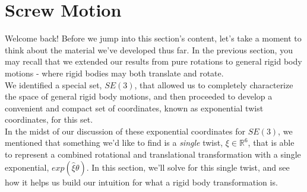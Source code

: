 \documentclass[oneside]{book}
\begin{document}
\section{Screw Motion}
Welcome back! Before we jump into this section's content, let's take a moment to think about the material we've developed thus far. In the previous section, you may recall that we extended our results from pure rotations to general rigid body motions - where rigid bodies may both translate and rotate.\\
We identified a special set, $SE(3)$, that allowed us to completely characterize the space of general rigid body motions, and then proceeded to develop a convenient and compact set of coordinates, known as exponential twist coordinates, for this set. \\
In the midst of our discussion of these exponential coordinates for $SE(3)$, we mentioned that something we'd like to find is a \textit{single} twist, $\xi \in \mathbb{R}^6$, that is able to represent a combined rotational and translational transformation with a single exponential, $exp(\hat\xi\theta)$. In this section, we'll solve for this single twist, and see how it helps us build our intuition for what a rigid body transformation is.
\end{document}
